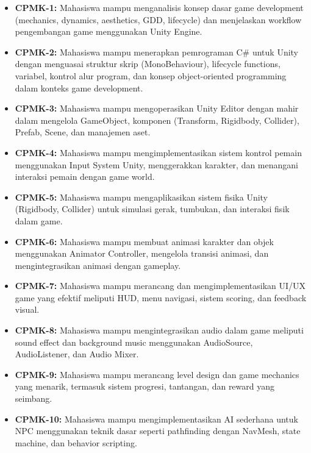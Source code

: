 \documentclass[12pt,a4paper]{article}
\begin{document}
\begin{itemize}[leftmargin=*]
  \item \textbf{CPMK-1:} Mahasiswa mampu menganalisis konsep dasar game development (mechanics, dynamics, aesthetics, GDD, lifecycle) dan menjelaskan workflow pengembangan game menggunakan Unity Engine.
  
  \item \textbf{CPMK-2:} Mahasiswa mampu menerapkan pemrograman C\# untuk Unity dengan menguasai struktur skrip (MonoBehaviour), lifecycle functions, variabel, kontrol alur program, dan konsep object-oriented programming dalam konteks game development.
  
  \item \textbf{CPMK-3:} Mahasiswa mampu mengoperasikan Unity Editor dengan mahir dalam mengelola GameObject, komponen (Transform, Rigidbody, Collider), Prefab, Scene, dan manajemen aset.
  
  \item \textbf{CPMK-4:} Mahasiswa mampu mengimplementasikan sistem kontrol pemain menggunakan Input System Unity, menggerakkan karakter, dan menangani interaksi pemain dengan game world.
  
  \item \textbf{CPMK-5:} Mahasiswa mampu mengaplikasikan sistem fisika Unity (Rigidbody, Collider) untuk simulasi gerak, tumbukan, dan interaksi fisik dalam game.
  
  \item \textbf{CPMK-6:} Mahasiswa mampu membuat animasi karakter dan objek menggunakan Animator Controller, mengelola transisi animasi, dan mengintegrasikan animasi dengan gameplay.
  
  \item \textbf{CPMK-7:} Mahasiswa mampu merancang dan mengimplementasikan UI/UX game yang efektif meliputi HUD, menu navigasi, sistem scoring, dan feedback visual.
  
  \item \textbf{CPMK-8:} Mahasiswa mampu mengintegrasikan audio dalam game meliputi sound effect dan background music menggunakan AudioSource, AudioListener, dan Audio Mixer.
  
  \item \textbf{CPMK-9:} Mahasiswa mampu merancang level design dan game mechanics yang menarik, termasuk sistem progresi, tantangan, dan reward yang seimbang.
  
  \item \textbf{CPMK-10:} Mahasiswa mampu mengimplementasikan AI sederhana untuk NPC menggunakan teknik dasar seperti pathfinding dengan NavMesh, state machine, dan behavior scripting.
  

\end{itemize}
\end{document}
